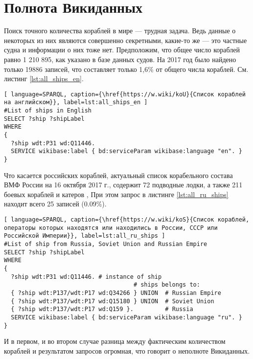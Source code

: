 \section{Полнота Викиданных}

Поиск точного количества кораблей в мире — трудная задача. Ведь данные о некоторых из них являются совершенно секретными, какие-то же — это частные судна и информации о них тоже нет. Предположим, что общее число кораблей равно 1 210 895, как указано в базе данных судов\cite{FleetMon}. На 2017 год было найдено только \num{19886} записей, что составляет только 1,6\% от общего числа кораблей. См. листинг \ref{lst:all_ships_en}.


\begin{lstlisting}[ language=SPARQL, caption={\href{https://w.wiki/koU}{Список кораблей на английском}}, label=lst:all_ships_en ]
#List of ships in English
SELECT ?ship ?shipLabel
WHERE
{
  ?ship wdt:P31 wd:Q11446.
  SERVICE wikibase:label { bd:serviceParam wikibase:language "en". }
}
\end{lstlisting}

Что касается российских кораблей, актуальный список корабельного состава ВМФ России на 16 октября 2017 г., содержит 72 подводные лодки, а также 211 боевых кораблей и катеров \cite{RussianShips}, При этом запрос в листинге \ref{lst:all_ru_ships} находит всего 25 записей (0.09\%).

\begin{lstlisting}[ language=SPARQL, caption={\href{https://w.wiki/koS}{Cписок кораблей, операторы которых находятся или находились в России, СССР или Российской Империи}}, label=lst:all_ru_ships ]
#List of ship from Russia, Soviet Union and Russian Empire
SELECT ?ship ?shipLabel
WHERE
{
  ?ship wdt:P31 wd:Q11446. # instance of ship
                                     # ships belongs to:
  { ?ship wdt:P137/wdt:P17 wd:Q34266 } UNION  # Russian Empire
  { ?ship wdt:P137/wdt:P17 wd:Q15180 } UNION  # Soviet Union
  { ?ship wdt:P137/wdt:P17 wd:Q159 }.         # Russia
  SERVICE wikibase:label { bd:serviceParam wikibase:language "ru". }
}
\end{lstlisting}

И в первом, и во втором случае разница между фактическим количеством кораблей и результатом запросов огромная, что говорит о неполноте Викиданных.

\label{question:ship_1}


